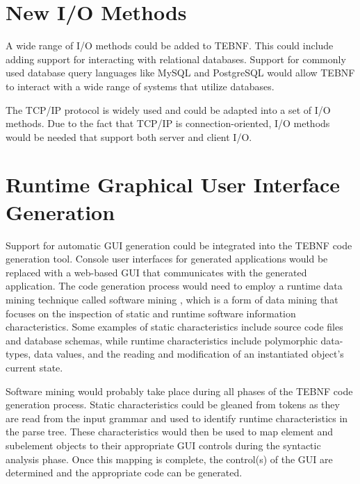 \section{New I/O Methods}
A wide range of I/O methods could be added to TEBNF.  This could include adding support for interacting with relational databases.  Support for commonly used database query languages like MySQL and PostgreSQL would allow TEBNF to interact with a wide range of systems that utilize databases.

\indent
The TCP/IP protocol is widely used and could be adapted into a set of I/O methods.  Due to the fact that TCP/IP is connection-oriented, I/O methods would be needed that support both server and client I/O.

\section{Runtime Graphical User Interface Generation}
Support for automatic GUI generation could be integrated into the TEBNF code generation tool.  Console user interfaces for generated applications would be replaced with a web-based GUI that communicates with the generated application.  The code generation process would need to employ a runtime data mining technique called software mining \cite{kennard_01,kennard_02}, which is a form of data mining that focuses on the inspection of static and runtime software information characteristics.  Some examples of static characteristics include source code files and database schemas, while runtime characteristics include polymorphic data-types, data values, and the reading and modification of an instantiated object’s current state.

\indent
Software mining \cite{kennard_01,kennard_02} would probably take place during all phases of the TEBNF code generation process.  Static characteristics could be gleaned from tokens as they are read from the input grammar and used to identify runtime characteristics in the parse tree.  These characteristics would then be used to map element and subelement objects to their appropriate GUI controls during the syntactic analysis phase.  Once this mapping is complete, the control(s) of the GUI are determined and the appropriate code can be generated.

